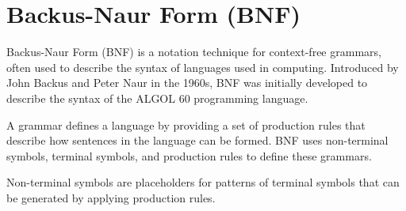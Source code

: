 %		

\section{Backus-Naur Form (BNF)}

Backus-Naur Form (BNF) is a notation technique for context-free grammars, often used to describe the syntax of languages used in computing. Introduced by John Backus and Peter Naur in the 1960s, BNF was initially developed to describe the syntax of the ALGOL 60 programming language.

A grammar defines a language by providing a set of production rules that describe how sentences in the language can be formed. BNF uses non-terminal symbols, terminal symbols, and production rules to define these grammars.

Non-terminal symbols are placeholders for patterns of terminal symbols that can be generated by applying production rules.

